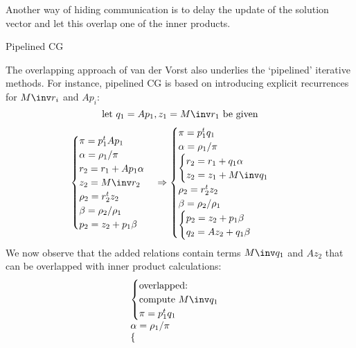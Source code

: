 \documentclass[11pt]{artikel3}
\begin{document}
\begin{Outline}
Another way of hiding communication is to delay the update of the
solution vector and let this overlap one of the inner products.

 {Pipelined CG}

The overlapping approach of van der Vorst also underlies the
`pipelined' iterative methods. For instance, pipelined CG is based on
introducing explicit recurrences for $M\inv r_i$ and $Ap_i$:
\[ \hbox{let $q_1=Ap_1, z_1=M\inv r_1$ be given} \]
\[
\begin{cases}
  \pi = p_1^tAp_1\\ \alpha = \rho_1 /\pi \\
  r_2 = r_1 + Ap_1\alpha\\
  z_2 = M\inv r_2\\
  \rho_2 = r_2^tz_2\\ \beta=\rho_2/\rho_1 \\
  p_2 = z_2 + p_1\beta\\
\end{cases}
\Rightarrow
\begin{cases}
  \pi = p_1^tq_1\\ \alpha = \rho_1 /\pi \\
  \begin{cases}
  r_2 = r_1 + q_1\alpha\\ z_2 = z_1+ M\inv q_1 \\
  \end{cases}\\  
  \rho_2 = r_2^tz_2\\ \beta=\rho_2/\rho_1 \\
  \begin{cases}
    p_2 = z_2 + p_1\beta\\
    q_2 = Az_2+q_1\beta\\
  \end{cases}\\  
\end{cases}
\]
We now observe that the added relations contain terms $M\inv q_1$ and
$Az_2$ that can be overlapped with inner product calculations:
\[
\begin{array}{l}
  \begin{cases}
    \hbox{overlapped:}\\
    \hbox{compute $M\inv q_1$} \\ \pi = p_1^tq_1\\ 
  \end{cases}\\  
  \alpha = \rho_1 /\pi \\
  \begin{cases}

\end{cases}
\end{array}\]
\end{Outline}
\end{document}
